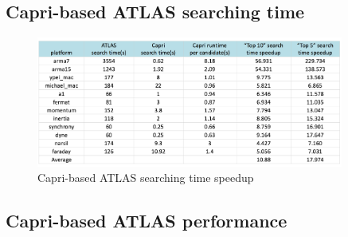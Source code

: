   \subsection{Capri-based ATLAS searching time}
  \label{sec:capri_atlas_searching}

  \begin{figure}[tbhp]
    \centering
    \includegraphics[width=0.9\textwidth]{images/timespeedup.png}
    \caption{Capri-based ATLAS searching time speedup}
    \label{fig:platforms}
  \end{figure}

  \subsection{Capri-based ATLAS performance}
  \label{sec:capri_atlas_performance}

